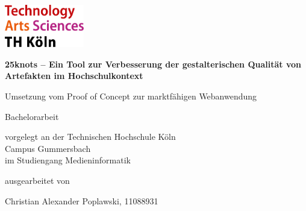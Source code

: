 \begin{titlepage}

\begin{center}

\begin{flushleft}
\includegraphics[width=0.26\textwidth]{images/logo_th.jpg}
\end{flushleft}

\vspace{1.6cm}

{\Large\textbf{25knots – Ein Tool zur Verbesserung der gestalterischen Qualität von Artefakten im Hochschulkontext}\par}
\vspace{0.5cm}
\begin{large}
Umsetzung vom Proof of Concept zur marktfähigen Webanwendung
\end{large}

\vspace{1.2cm}

\begin{LARGE}
\begin{scshape}
Bachelorarbeit\\
\end{scshape}
\end{LARGE}

\vspace{0.8cm}

\begin{normalsize}
vorgelegt an der Technischen Hochschule Köln\\
Campus Gummersbach\\
im Studiengang Medieninformatik\\
\end{normalsize}
\vspace{0.8cm}

ausgearbeitet von\\
\vspace{0.2cm}
\begin{large}
Christian Alexander Poplawski, 11088931\\
\end{large}


\end{center}
\end{titlepage}
